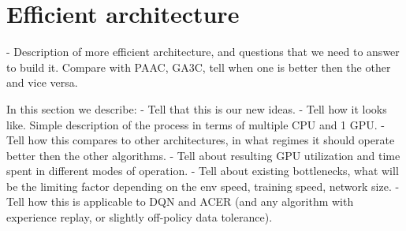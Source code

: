 \section{Efficient architecture}

- Description of more efficient architecture, and questions that we need to
  answer to build it. Compare with PAAC, GA3C, tell when one is better then
  the other and vice versa.

In this section we describe:
- Tell that this is our new ideas.
- Tell how it looks like. Simple description of the process in terms of multiple CPU and 1 GPU.
- Tell how this compares to other architectures, in what regimes it should operate better then
the other algorithms.
- Tell about resulting GPU utilization and time spent in different modes of operation.
- Tell about existing bottlenecks, what will be the limiting factor depending on the env speed,
training speed, network size.
- Tell how this is applicable to DQN and ACER (and any algorithm with experience replay, or
slightly off-policy data tolerance).
